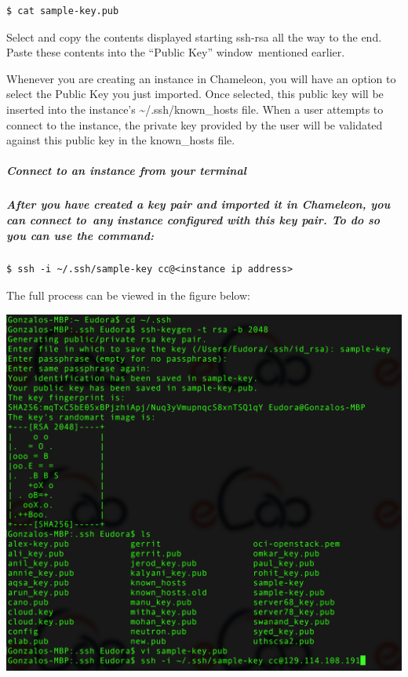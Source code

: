 \begin{verbatim}
$ cat sample-key.pub
\end{verbatim}

Select and copy the contents displayed starting ssh-rsa all the way to
the end. Paste these contents into the ``Public Key'' window~mentioned
earlier.

Whenever you are creating an instance in Chameleon, you will have an
option to select the Public Key you just imported. Once selected, this
public key will be inserted into the instance's
\textasciitilde{}/.ssh/known\_hosts file. When a user attempts to
connect to the instance, the private key provided by the user will be
validated against this public key in the known\_hosts file.

\subparagraph{Connect to an instance from your
terminal}\label{connect-to-an-instance-from-your-terminal}

\subparagraph{After you have created a key pair and imported it in
Chameleon, you can connect to~any instance configured with this key
pair. To do so you can use the
command:}\label{after-you-have-created-a-key-pair-and-imported-it-in-chameleon-you-can-connect-toany-instance-configured-with-this-key-pair.-to-do-so-you-can-use-the-command}

\begin{verbatim}
$ ssh -i ~/.ssh/sample-key cc@<instance ip address>
\end{verbatim}

The full process can be viewed in the figure below:

{\includegraphics[width=\columnwidth]{images/chameleon/ssh1.png}}

